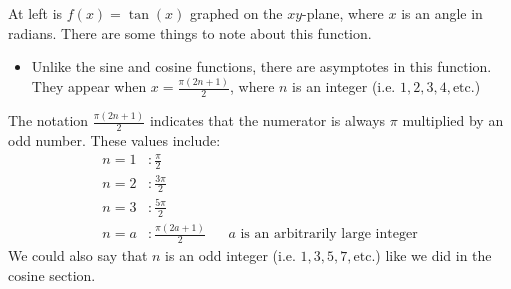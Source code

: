 \begin{center}
    \begin{minipage}[c]{0.33\linewidth}
    \end{minipage}
    \begin{minipage}[c]{0.66\textwidth}
        At left is $f(x) = \tan(x)$ graphed on the $xy$-plane, where $x$ is an angle in radians. There are some things to note about this function.
        \begin{itemize}
            \item Unlike the sine and cosine functions, there are asymptotes in this function. They appear when $x = \frac{\pi(2n + 1)}{2}$, where $n$ is an integer (i.e. $1,2,3,4,\text{etc.}$)
        \end{itemize}
    \end{minipage}
\end{center}
The notation $\frac{\pi(2n + 1)}{2}$ indicates that the numerator is always $\pi$ multiplied by an odd number. These values include:
\begin{align*}
    n = 1&: \frac{\pi}{2} \\
    n = 2&: \frac{3\pi}{2} \\
    n = 3&: \frac{5\pi}{2} \\
    n = a&: \frac{\pi(2a + 1)}{2} && \text{$a$ is an arbitrarily large integer}
\end{align*}
We could also say that $n$ is an odd integer (i.e. $1,3,5,7,\text{etc.}$) like we did in the cosine section.

